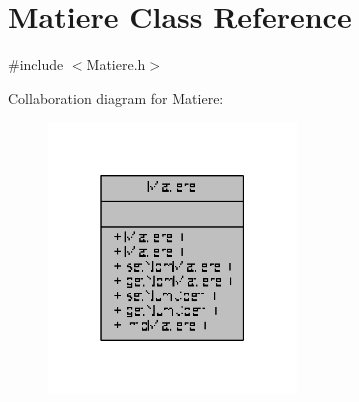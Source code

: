\hypertarget{class_matiere}{\section{Matiere Class Reference}
\label{class_matiere}
}


{\ttfamily \#include $<$Matiere.\+h$>$}



Collaboration diagram for Matiere\+:\nopagebreak
\begin{figure}[H]
\begin{center}
\leavevmode
\includegraphics[width=187pt]{class_matiere__coll__graph}
\end{center}
\end{figure}
